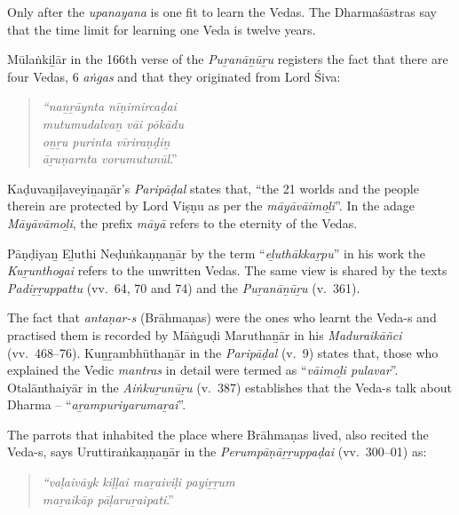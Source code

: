 \vskip -11pt

Only after the \textit{upanayana} is one fit to learn the Vedas. The Dharmaśāstras say that the time limit for learning one Veda is twelve years.

Mūlaṅkiḻār in the 166th verse of the \textit{Puṟanāṉūṟu} registers the fact that there are four Vedas, 6 \textit{aṅgas} and that they originated from Lord Śiva:

\vskip -9pt

\begin{quote}
\textit{“naṉṟāynta nīṇimircaḍai}\\\textit{mutumudalvaṉ vāi pōkādu}\\\textit{oṉṟu purinta vīriraṇḍiṉ}\\\textit{āṟuṇarnta vorumutunūl}.”
\end{quote}

\vskip -9pt

Kaḍuvaṉiḷaveyiṉaṉār’s \textit{Paripāḍal} states that, “the 21 worlds and the people therein are protected by Lord Viṣṇu as per the \textit{māyāvāimoḻi}”. In the adage \textit{Māyāvāmoḻi}, the prefix \textit{māyā} refers to the eternity of the Vedas.

Pāṇḍiyaṉ Eḻuthi Neḍuṅkaṇṇaṉār by the term “\textit{eḻuthākkaṟpu}” in his work the \textit{Kuṟunthogai} refers to the unwritten Vedas. The same view is shared by the texts \textit{Padiṟṟuppattu} (vv.~64, 70 and 74) and the \textit{Puṟanāṉūṟu} (v.~361).

The fact that \textit{antaṇar-s} (Brāhmaṇas) were the ones who learnt the Veda-s and practised them is recorded by Māṅguḍi Maruthaṉār in his \textit{Maduraikāñci} (vv.~468–76). Kuṉṟambhūthaṉār in the \textit{Paripāḍal} (v.~9) states that, those who explained the Vedic \textit{mantras} in detail were termed as “\textit{vāimoḻi pulavar}”. Otalānthaiyār in the \textit{Aiṅkuṟunūṟu} (v.~387) establishes that the Veda-s talk about Dharma – “\textit{aṟampuriyarumaṟai}”.

The parrots that inhabited the place where Brāhmaṇas lived, also recited the Veda-s, says Uruttiraṅkaṇṇaṉār in the \textit{Perumpāṇāṟṟuppaḍai} (vv.~300–01) as:

\vskip -9pt

\begin{quote}
\textit{“vaḷaivāyk kiḷḷai maṟaiviḷi payiṟṟum}\\\textit{ maṟaikāp pāḷaruṟaipati}.”
\end{quote}


